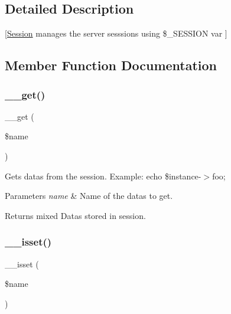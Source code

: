 \subsection{Detailed Description}
\mbox{[}\mbox{\hyperlink{class_session}{Session}} manages the server sesssions using \$\+\_\+\+S\+E\+S\+S\+I\+ON var \mbox{]} 

\subsection{Member Function Documentation}
\mbox{\label{class_session_acc8847f87313d5e08ad460225ca99e3b}} 
\subsubsection{\texorpdfstring{\+\_\+\+\_\+get()}{\_\_get()}}
{\footnotesize\ttfamily \+\_\+\+\_\+get (\begin{DoxyParamCaption}\item[{}]{\$name }\end{DoxyParamCaption})}

Gets datas from the session. Example\+: echo \$instance-\/$>$foo;


\begin{DoxyParams}{Parameters}
{\em name} & Name of the datas to get. \\
\hline
\end{DoxyParams}
\begin{DoxyReturn}{Returns}
mixed Datas stored in session. 
\end{DoxyReturn}
\mbox{\label{class_session_aeea656aa2c004061049f3896c564ccf0}} 
\subsubsection{\texorpdfstring{\+\_\+\+\_\+isset()}{\_\_isset()}}
{\footnotesize\ttfamily \+\_\+\+\_\+isset (\begin{DoxyParamCaption}\item[{}]{\$name }\end{DoxyParamCaption})}

\mbox{\label{class_session_ab5037276ea3c15db77508b58c09ac59e}} 
